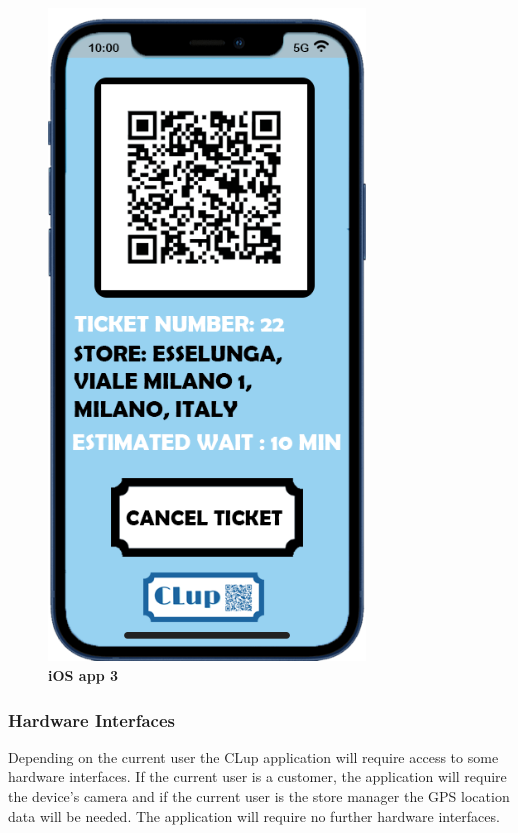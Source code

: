\begin{figure}[!h]
\begin{minipage}{0.4\textwidth}
\includegraphics[width=0.75\textwidth]{Images/App/iPhone_RequestTicket}
\captionsetup{justification=centering}
\caption{\label{fig:ios3}\textbf{iOS app 3}}
\end{minipage}
\end{figure}

\newpage

\subsubsection{Hardware Interfaces}
\hspace{\parindent}Depending on the current user the CLup application will require access to some hardware interfaces. If the current user is a customer, the application will require the device's camera and if the current user is the store manager the GPS location data will be needed. The application will require no further hardware interfaces.
